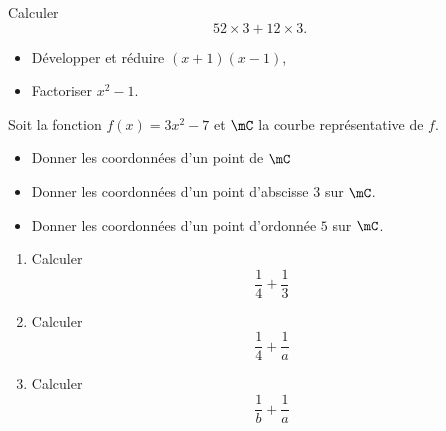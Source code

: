 \begin{MentalActivity}
\begin{mental}
            Calculer
            \begin{equation*}
                52\times 3+12\times 3.
            \end{equation*}
\end{mental}

\begin{mental}
        \begin{itemize}
            \item
    Développer et réduire $(x+1)(x-1)$, 
\item
    Factoriser $x^2-1$.
        \end{itemize}
\end{mental}


\begin{mental}
            Soit la fonction \( f(x)=3x^2-7\) et \( \mC\) la courbe représentative de \( f\).
            \begin{itemize}
            \item Donner les coordonnées d'un point de \( \mC\)
            \item Donner les coordonnées d'un point d'abscisse \( 3\) sur \( \mC\).
            \item Donner les coordonnées d'un point d'ordonnée \( 5\) sur \( \mC\).
            \end{itemize}
\end{mental}

\begin{mental}
    \begin{enumerate}
        \item
            Calculer
            \begin{equation*}
                \frac{1}{ 4 }+\frac{1}{ 3 }
            \end{equation*}
        \item
            Calculer 
            \begin{equation*}
                \frac{1}{ 4 }+\frac{1}{ a }
            \end{equation*}
        \item
            Calculer
            \begin{equation*}
                \frac{1}{ b }+\frac{1}{ a }
            \end{equation*}
    \end{enumerate}
\end{mental}

\end{MentalActivity}


